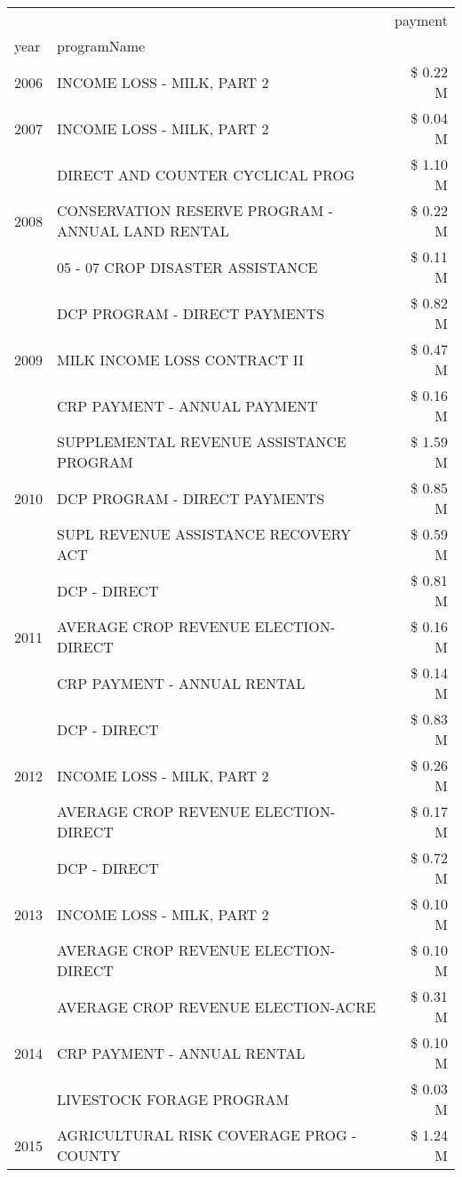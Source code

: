 \begin{tabular}{llr}
\toprule
 &  & payment \\
year & programName &  \\
\midrule
2006 & INCOME LOSS - MILK, PART 2 & \$ 0.22 M \\
\cline{1-3}
2007 & INCOME LOSS - MILK, PART 2 & \$ 0.04 M \\
\cline{1-3}
\multirow[t]{3}{*}{2008} & DIRECT AND COUNTER CYCLICAL PROG & \$ 1.10 M \\
 & CONSERVATION RESERVE PROGRAM - ANNUAL LAND RENTAL & \$ 0.22 M \\
 & 05 - 07 CROP DISASTER ASSISTANCE & \$ 0.11 M \\
\cline{1-3}
\multirow[t]{3}{*}{2009} & DCP PROGRAM - DIRECT PAYMENTS & \$ 0.82 M \\
 & MILK INCOME LOSS CONTRACT II & \$ 0.47 M \\
 & CRP PAYMENT - ANNUAL PAYMENT & \$ 0.16 M \\
\cline{1-3}
\multirow[t]{3}{*}{2010} & SUPPLEMENTAL REVENUE ASSISTANCE PROGRAM & \$ 1.59 M \\
 & DCP PROGRAM - DIRECT PAYMENTS & \$ 0.85 M \\
 & SUPL REVENUE ASSISTANCE RECOVERY ACT & \$ 0.59 M \\
\cline{1-3}
\multirow[t]{3}{*}{2011} & DCP - DIRECT & \$ 0.81 M \\
 & AVERAGE CROP REVENUE ELECTION-DIRECT & \$ 0.16 M \\
 & CRP PAYMENT - ANNUAL RENTAL & \$ 0.14 M \\
\cline{1-3}
\multirow[t]{3}{*}{2012} & DCP - DIRECT & \$ 0.83 M \\
 & INCOME LOSS - MILK, PART 2 & \$ 0.26 M \\
 & AVERAGE CROP REVENUE ELECTION-DIRECT & \$ 0.17 M \\
\cline{1-3}
\multirow[t]{3}{*}{2013} & DCP - DIRECT & \$ 0.72 M \\
 & INCOME LOSS - MILK, PART 2 & \$ 0.10 M \\
 & AVERAGE CROP REVENUE ELECTION-DIRECT & \$ 0.10 M \\
\cline{1-3}
\multirow[t]{3}{*}{2014} & AVERAGE CROP REVENUE ELECTION-ACRE & \$ 0.31 M \\
 & CRP PAYMENT - ANNUAL RENTAL & \$ 0.10 M \\
 & LIVESTOCK FORAGE PROGRAM & \$ 0.03 M \\
\cline{1-3}
\multirow[t]{3}{*}{2015} & AGRICULTURAL RISK COVERAGE PROG - COUNTY & \$ 1.24 M \\

\end{tabular}
